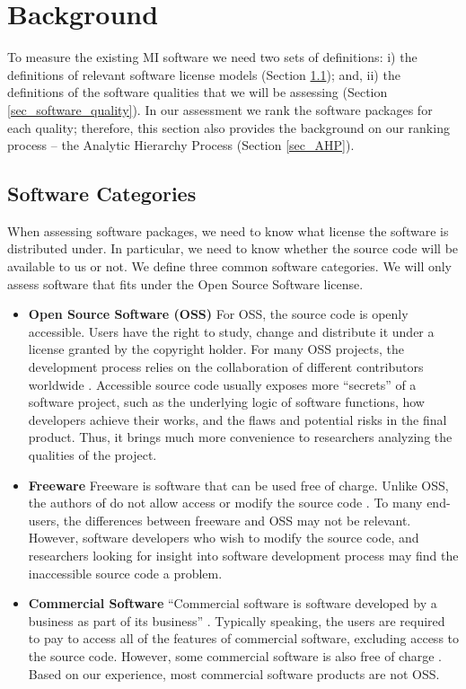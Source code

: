 \documentclass[final, 3p, times, authoryear]{elsarticle}
\begin{document}
\section{Background} \label{ch_background}

To measure the existing MI software we need two sets of definitions: i) the
definitions of relevant software license models (Section
\ref{sec_software_categories}); and, ii) the definitions of the software
qualities that we will be assessing (Section \ref{sec_software_quality}). In our
assessment we rank the software packages for each quality; therefore, this
section also provides the background on our ranking process -- the Analytic
Hierarchy Process (Section \ref{sec_AHP}).

\subsection{Software Categories} \label{sec_software_categories}

When assessing software packages, we need to know what license the software is
distributed under.  In particular, we need to know whether the source code will
be available to us or not.  We define three common software categories.  We will
only assess software that fits under the Open Source Software license.

\begin{itemize}

\item \textbf{Open Source Software (OSS)} For OSS, the source code is openly
accessible. Users have the right to study, change and distribute it under a
license granted by the copyright holder. For many OSS projects, the development
process relies on the collaboration of different contributors worldwide
\citep{Corbly2014}. Accessible source code usually exposes more ``secrets'' of a
software project, such as the underlying logic of software functions, how
developers achieve their works, and the flaws and potential risks in the final
product. Thus, it brings much more convenience to researchers analyzing the
qualities of the project.

\item \textbf{Freeware} Freeware is software that can be used free of charge.
Unlike OSS, the authors of do not allow access or modify the source code
\citep{LINFO2006}. To many end-users, the differences between freeware and OSS
may not be relevant. However, software developers who wish to modify the source
code, and researchers looking for insight into software development process may
find the inaccessible source code a problem. 

\item \textbf{Commercial Software} ``Commercial software is software developed
by a business as part of its business'' \citep{GNU2019}. Typically speaking, the
users are required to pay to access all of the features of commercial software,
excluding access to the source code. However, some commercial software is also
free of charge \citep{GNU2019}. Based on our experience, most commercial
software products are not OSS.

\end{itemize}
\end{document}
